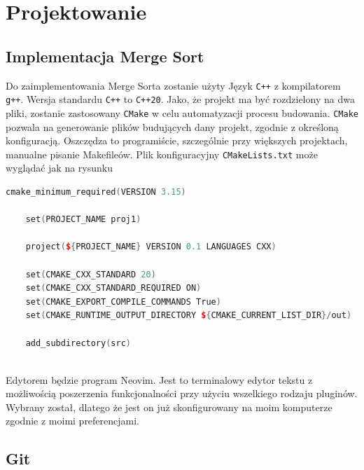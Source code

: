 	\newpage
\section{Projektowanie}		%

\subsection{Implementacja Merge Sort}


Do zaimplementowania Merge Sorta zostanie użyty Język \texttt{C++} z kompilatorem \texttt{g++}. Wersja standardu \texttt{C++} to \texttt{C++20}. Jako, że projekt ma być rozdzielony na dwa pliki, zostanie zastosowany \texttt{CMake} w celu automatyzacji procesu budowania. \texttt{CMake} pozwala na generowanie plików budujących dany projekt, zgodnie z określoną konfiguracją. Oszczędza to programiście, szczególnie przy większych projektach, manualne pisanie Makefileów.
Plik konfiguracyjny \texttt{CMakeLists.txt} może wyglądać jak na rysunku

\begin{lstlisting}[caption=Plik konfiguracyjny CMake, label={lst:cmakelists}, language=C++]
	cmake_minimum_required(VERSION 3.15)
	
	set(PROJECT_NAME proj1)
	
	project(${PROJECT_NAME} VERSION 0.1 LANGUAGES CXX)
	
	set(CMAKE_CXX_STANDARD 20)
	set(CMAKE_CXX_STANDARD_REQUIRED ON)
	set(CMAKE_EXPORT_COMPILE_COMMANDS True)
	set(CMAKE_RUNTIME_OUTPUT_DIRECTORY ${CMAKE_CURRENT_LIST_DIR}/out)
	
	add_subdirectory(src)
	
\end{lstlisting}

Edytorem będzie program Neovim. Jest to terminalowy edytor tekstu z możliwością poszerzenia funkcjonalności przy użyciu wszelkiego rodzaju pluginów. Wybrany został, dlatego że jest on już skonfigurowany na moim komputerze zgodnie z moimi preferencjami.

\subsection{Git}

